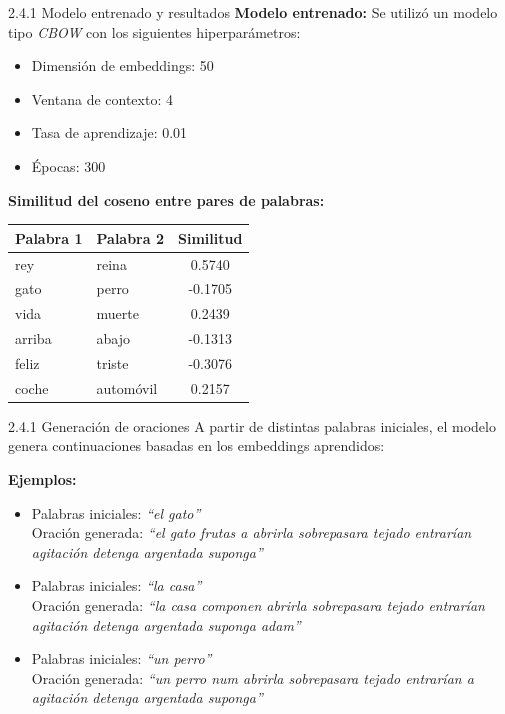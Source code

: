 \documentclass{beamer}
\begin{document}
\begin{frame}{2.4.1 Modelo entrenado y resultados}
	\justifying
	\textbf{Modelo entrenado:} Se utilizó un modelo tipo \textit{CBOW} con los siguientes hiperparámetros:
	\begin{itemize}
		\item Dimensión de embeddings: 50
		\item Ventana de contexto: 4
		\item Tasa de aprendizaje: 0.01
		\item Épocas: 300
	\end{itemize}
	
	\vspace{0.3cm}
	\textbf{Similitud del coseno entre pares de palabras:}
	\begin{table}[]
		\centering
		\begin{tabular}{l l c}
			\hline
			Palabra 1 & Palabra 2 & Similitud \\
			\hline
			rey     & reina     & 0.5740 \\
			gato    & perro     & -0.1705 \\
			vida    & muerte    & 0.2439 \\
			arriba  & abajo     & -0.1313 \\
			feliz   & triste    & -0.3076 \\
			coche   & automóvil & 0.2157 \\
			\hline
		\end{tabular}
	\end{table}
	
\end{frame}


\begin{frame}{2.4.1 Generación de oraciones}
	\justifying
	A partir de distintas palabras iniciales, el modelo genera continuaciones basadas en los embeddings aprendidos:
	
	\vspace{0.3cm}
	\textbf{Ejemplos:}
	\begin{itemize}
		\item Palabras iniciales: \textit{``el gato''} \\
		Oración generada: \textit{``el gato frutas a abrirla sobrepasara tejado entrarían agitación detenga argentada suponga''}
		\item Palabras iniciales: \textit{``la casa''} \\
		Oración generada: \textit{``la casa componen abrirla sobrepasara tejado entrarían agitación detenga argentada suponga adam''}
		\item Palabras iniciales: \textit{``un perro''} \\
		Oración generada: \textit{``un perro num abrirla sobrepasara tejado entrarían a agitación detenga argentada suponga''}
	\end{itemize}
\end{frame}
\end{document}
